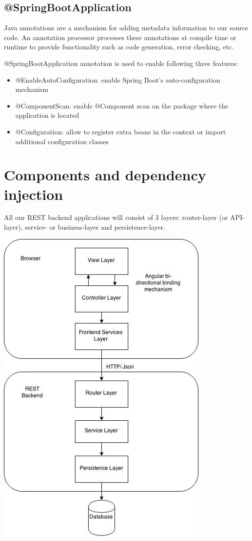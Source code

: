 \documentclass[a4paper, 12pt]{report}
\begin{document}
\subsection{@SpringBootApplication}

Java annotations are a mechanism for adding metadata information to our source code. An annotation processor processes these annotations at compile time or runtime to provide functionality such as code generation, error checking, etc.

@SpringBootApplication annotation is used to enable following three features:
\begin{itemize}
\item @EnableAutoConfiguration: enable Spring Boot’s auto-configuration mechanism
\item @ComponentScan: enable @Component scan on the package where the application is located
\item @Configuration: allow to register extra beans in the context or import additional configuration classes
\end{itemize}


\section{Components and dependency injection}

All our REST backend applications will consist of 3 layers:
 router-layer (or API-layer), service- or business-layer and persistence-layer.

\includegraphics[scale=0.6]{./images/chapter1/spring-architecture.jpeg} 
\end{document}
